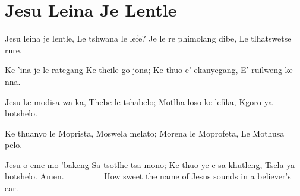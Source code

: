 \starttocol
\chapter{Jesu Leina Je Lentle}
\nexttocol
\hfill{\it }
\stoptocol
\starttocol
\startlines
{\sc Jesu} leina je lentle,
Le tshwana le lefe?
Je le re phimolang dibe,
Le tlhatswetse rure.

Ke 'ina je le rategang 
Ke theile go jona;
Ke thuo e' ekanyegang,
E' ruilweng ke nna.

Jesu ke modisa wa ka,
Thebe le tshabelo;
Motlha loso ke lefika,
Kgoro ya botshelo.

Ke thuanyo le Moprista,
Moswela melato;
Morena le Moprofeta,
Le Mothusa pelo.

Jesu o eme mo 'bakeng
Sa tsotlhe tsa mono;
Ke thuo ye e sa khutleng,
Tsela ya botshelo.
          \hfill Amen.~~~~~~~~~
\stoplines
\nexttocol
How sweet the name of Jesus sounds
in a believer's ear.
\stoptocol
